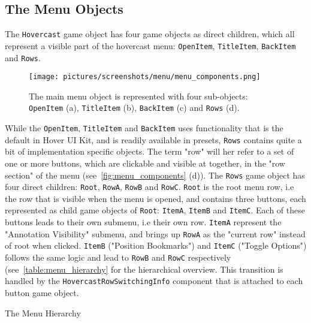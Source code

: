\subsection{The Menu Objects}
The \texttt{Hovercast} game object has four game objects as direct children, which all represent a visible part of the hovercast menu:
\texttt{OpenItem}, \texttt{TitleItem}, \texttt{BackItem} and \texttt{Rows}. 

\begin{figure}%
	\texttt{[image: pictures/screenshots/menu/menu\_components.png]}
	\caption[The Menu components]{The main menu object is represented with four sub-objects: \texttt{OpenItem} (a), \texttt{TitleItem} (b), \texttt{BackItem} (c) 
			 and \texttt{Rows} (d).}
	\label{fig:menu_components}
\end{figure}

While the \texttt{OpenItem}, \texttt{TitleItem} and \texttt{BackItem} uses functionality that is the default in Hover UI Kit, and is readily available in presets,
\texttt{Rows} contains quite a bit of implementation specific objects. The term "row" will her refer to a set of one or more buttons, which are clickable and visible at together,
in the "row section" of the menu (see~\vref{fig:menu_components} (d)). The \texttt{Rows} game object has four direct children: \texttt{Root}, \texttt{RowA}, \texttt{RowB} 
and \texttt{RowC}. \texttt{Root} is the root menu row, i.e the row that is visible when the menu is opened, and contains three buttons, each represented as 
child game objects of \texttt{Root}: \texttt{ItemA}, \texttt{ItemB} and \texttt{ItemC}. Each of these buttons leads to their own submenu, i.e their own row. 
\texttt{ItemA} represent the "Annotation Visibility" submenu, and brings up \texttt{RowA} as the "current row" instead of root when clicked. \texttt{ItemB} ("Position Bookmarks") 
and \texttt{ItemC} ("Toggle Options") follows the same logic and lead to \texttt{RowB} and \texttt{RowC} respectively (see~\vref{table:menu_hierarchy} for the hierarchical overview. 
This transition is handled by the \texttt{HovercastRowSwitchingInfo} component that is attached to each button game object.  

\renewcommand{\DTstyle}{\textrm\expandafter\raisebox{-0.7ex}}
\DTsetlength{1em}{1em}{0.2em}{0.4pt}{0.4pt}
\setlength{\DTbaselineskip}{2\baselineskip}

\begin{table}[]
\label{table:menu_hierarchy}
\caption[The Menu Hierarchy]{The Menu Hierarchy}
\end{table}

